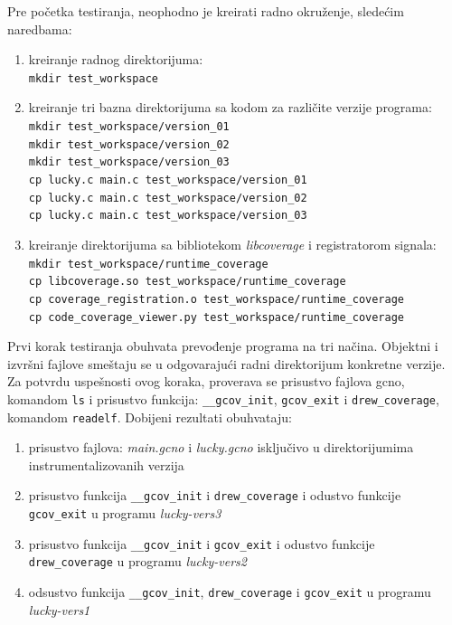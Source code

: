 \documentclass[12pt,oneside]{memoir}
\newcommand{\kod}[1]{\texttt{#1}}
\newcommand{\strano}[1]{\textit{#1}}
\begin{document}
Pre početka testiranja, neophodno je kreirati radno okruženje, sledećim naredbama:
\begin{enumerate}
\item kreiranje radnog direktorijuma: \\
\kod{mkdir test\_workspace}
\item kreiranje tri bazna direktorijuma sa kodom za različite verzije programa: \\
\kod{mkdir test\_workspace/version\_01} \\
\kod{mkdir test\_workspace/version\_02} \\ 
\kod{mkdir test\_workspace/version\_03} \\
\kod{cp lucky.c main.c test\_workspace/version\_01} \\
\kod{cp lucky.c main.c test\_workspace/version\_02} \\
\kod{cp lucky.c main.c test\_workspace/version\_03} 
\item kreiranje direktorijuma sa bibliotekom \strano{libcoverage} i registratorom signala: \\
\kod{mkdir test\_workspace/runtime\_coverage} \\
\kod{cp libcoverage.so test\_workspace/runtime\_coverage} \\
\kod{cp coverage\_registration.o test\_workspace/runtime\_coverage} \\ 
\kod{cp code\_coverage\_viewer.py test\_workspace/runtime\_coverage}
\end{enumerate}

Prvi korak testiranja obuhvata prevođenje programa na tri načina. Objektni i izvršni fajlove smeštaju se u odgovarajući radni direktorijum konkretne verzije. Za potvrdu uspešnosti ovog koraka, proverava se prisustvo fajlova gcno, komandom \kod{ls} i prisustvo funkcija: \kod{\_\_gcov\_init}, \kod{gcov\_exit} i \kod{drew\_coverage}, komandom \kod{readelf}. Dobijeni rezultati obuhvataju:
\begin{enumerate}
\item prisustvo fajlova: \strano{main.gcno} i \strano{lucky.gcno} isključivo u direktorijumima instrumentalizovanih verzija
\item prisustvo funkcija \kod{\_\_gcov\_init} i \kod{drew\_coverage} i odustvo funkcije \kod{gcov\_exit} u programu \strano{lucky-vers3}
\item prisustvo funkcija \kod{\_\_gcov\_init} i \kod{gcov\_exit} i odustvo funkcije \kod{drew\_coverage} u programu \strano{lucky-vers2}
\item odsustvo funkcija \kod{\_\_gcov\_init}, \kod{drew\_coverage} i \kod{gcov\_exit} u programu \strano{lucky-vers1}
\end{enumerate}
\end{document}
